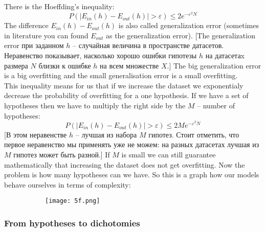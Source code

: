 There is the Hoeffding's inequality:
\hypertarget{gen_error}{}
$$P(|E_{in}(h)-E_{out}(h)|>\varepsilon)\le2e^{-\varepsilon^2N}$$
The difference $E_{in}(h)-E_{out}(h)$ is also called generalization error (sometimes in literature you can found $E_{out}$ as the generalization error). [The generalization error при заданном $h$ -- случайная величина в пространстве датасетов. Неравенство показывает, насколько хорошо ошибки гипотезы $h$ на датасетаx размера $N$ близки к ошибке $h$ на всем множестве $X$.] The big generalization error is a big overfitting and the small generalisation error is a small overfitting.\\
This inequality means for us that if we increase the dataset we exponentialy decrease the probability of overfitting for a one hypothesis. If we have a set of hypotheses then we have to multiply the right side by the $M$ -- number of hypotheses: 
$$P(|E_{in}(h)-E_{out}(h)|>\varepsilon)\le 2Me^{-\varepsilon^2N}$$
[В этом неравенстве $h$ -- лучшая из набора $M$ гипотез. Стоит отметить, что первое неравенство мы применять уже не можем: на разных датасетах лучшая из $M$ гипотез может быть разной.] If $M$ is small we can still guarantee mathematically that increasing the dataset does not get overfitting. Now the problem is how many hypotheses can we have. So this is a graph how our models behave ourselves in terms of complexity:
\begin{figure}[h!]
  \centering
  \begin{subfigure}[l]{0.7\linewidth}
    \texttt{[image: 5f.png]}
  \end{subfigure}
\end{figure}

\subsubsection*{From hypotheses to dichotomies}

